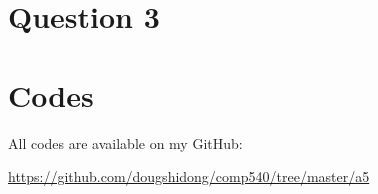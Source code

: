 \documentclass[letterpaper,12pt,]{article}
\begin{document}


\section*{Question 3}


\section*{Codes}

All codes are available on my GitHub:

\url{https://github.com/dougshidong/comp540/tree/master/a5}
\end{document}

